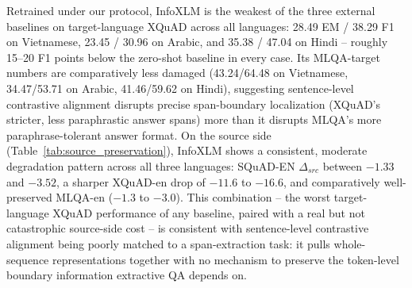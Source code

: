 \documentclass[11pt]{article}
\begin{document}
Retrained under our protocol, InfoXLM is the weakest of the three external baselines on target-language XQuAD across all languages: 28.49 EM / 38.29 F1 on Vietnamese, 23.45 / 30.96 on Arabic, and 35.38 / 47.04 on Hindi -- roughly 15--20 F1 points below the zero-shot baseline in every case. Its MLQA-target numbers are comparatively less damaged (43.24/64.48 on Vietnamese, 34.47/53.71 on Arabic, 41.46/59.62 on Hindi), suggesting sentence-level contrastive alignment disrupts precise span-boundary localization (XQuAD's stricter, less paraphrastic answer spans) more than it disrupts MLQA's more paraphrase-tolerant answer format. On the source side (Table~\ref{tab:source_preservation}), InfoXLM shows a consistent, moderate degradation pattern across all three languages: SQuAD-EN $\Delta_{src}$ between $-1.33$ and $-3.52$, a sharper XQuAD-en drop of $-11.6$ to $-16.6$, and comparatively well-preserved MLQA-en ($-1.3$ to $-3.0$). This combination -- the worst target-language XQuAD performance of any baseline, paired with a real but not catastrophic source-side cost -- is consistent with sentence-level contrastive alignment being poorly matched to a span-extraction task: it pulls whole-sequence representations together with no mechanism to preserve the token-level boundary information extractive QA depends on.
\end{document}
